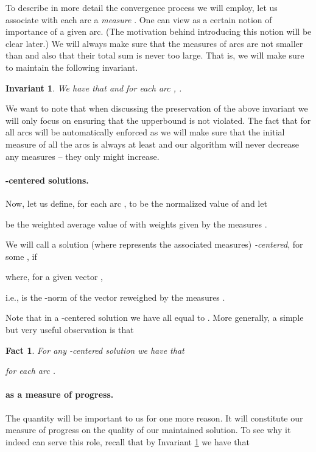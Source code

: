 \documentclass[11pt, letterpaper]{article}
\newtheorem{fact}[theorem]{Fact}
\newtheorem{invariant}[theorem]{Invariant}
\begin{document}
To describe in more detail the convergence process we will employ, let us associate with each arc  a {\em measure} . One can view  as a certain notion of importance of a given arc. (The motivation behind introducing this notion will be clear later.) We will always make sure that the measures of arcs are not smaller than  and also that their total sum is never too large. That is, we will make sure to maintain the following invariant.

\begin{invariant}
\label{inv:measure_upperbound}
We have that  and for each arc , .
\end{invariant}

We want to note that when discussing the preservation of the above invariant we will only focus on ensuring that the upperbound is not violated. The fact that  for all arcs  will be automatically enforced as we will make sure that the initial measure of all the arcs is always at least  and our algorithm will never decrease any measures -- they only might increase. 


\paragraph{-centered solutions.} Now, let us define, for each arc ,  to be the normalized value of  and let 

be the weighted average value of  with weights given by the measures .

We will call a solution  (where  represents the associated measures) {\em -centered}, for some , if 

where, for a given vector ,
 
i.e.,  is the -norm of the vector  reweighed by the measures . 

Note that in a -centered solution  we have all  equal to . More generally, a simple but very useful observation is that
\begin{fact}
\label{fa:central_vs_max_min}
For any -centered solution  we have that

for each arc . 
\end{fact}

\paragraph{ as a measure of progress.} The quantity  will be important to us for one more reason. It will constitute our measure of progress on the quality of our maintained solution. To see why it indeed can serve this role, recall that by Invariant \ref{inv:measure_upperbound} we have that 
\end{document}
